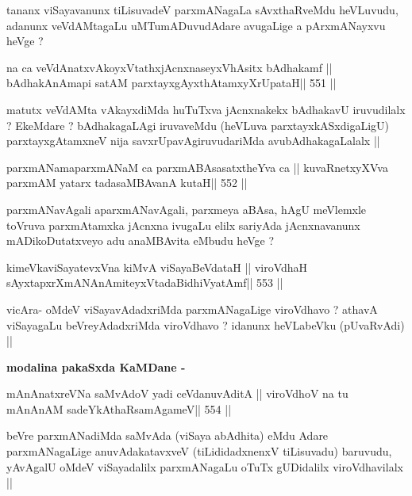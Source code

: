 \begin{artha}
tananx viSayavanunx tiLisuvadeV parxmANagaLa sAvxthaRveMdu heVLuvudu,
adanunx veVdAMtagaLu uMTumADuvudAdare avugaLige a pArxmANayxvu heVge ?
\end{artha}

\begin{shl}
na ca veVdAnatxvAkoyxVtathxjAcnxnaseyxVhAsitx bAdhakamf ||
bAdhakAnAmapi satAM parxtayxgAyxthAtamxyXrUpataH\hfill || 551 ||
\end{shl}

\begin{artha}
matutx veVdAMta vAkayxdiMda huTuTxva jAcnxnakekx bAdhakavU iruvudilalx
? EkeMdare ? bAdhakagaLAgi iruvaveMdu (heVLuva parxtayxkASxdigaLigU)
parxtayxgAtamxneV nija savxrUpavAgiruvudariMda avubAdhakagaLalalx ||
\end{artha}

\begin{shl}
parxmANamaparxmANaM ca parxmABAsasatxtheYva ca ||
kuvaRnetxyXVva parxmAM yatarx tadasaMBAvanA kutaH\hfill || 552 ||
\end{shl}

\begin{artha}
parxmANavAgali aparxmANavAgali, parxmeya aBAsa, hAgU meVlemxle
toVruva parxmAtamxka jAcnxna ivugaLu elilx sariyAda jAcnxnavanunx
mADikoDutatxveyo adu anaMBAvita eMbudu heVge ? 
\end{artha}

\begin{shl}
kimeVkaviSayatevxVna kiMvA viSayaBeVdataH ||
viroVdhaH sAyxtapxrXmANAnAmiteyxVtadaBidhiVyatAmf\hfill || 553 ||
\end{shl}

\begin{artha}
vicAra- oMdeV viSayavAdadxriMda parxmANagaLige viroVdhavo ? athavA
viSayagaLu beVreyAdadxriMda viroVdhavo ? idanunx heVLabeVku
(pUvaRvAdi) ||
\end{artha}

\medskip
\centerline{\textbf{modalina pakaSxda KaMDane -}}

\begin{shl}
mAnAnatxreVNa saMvAdoV yadi ceVdanuvAditA ||
viroVdhoV na tu mAnAnAM sadeYkAthaRsamAgameV\hfill || 554 ||
\end{shl}

\begin{artha}
beVre parxmANadiMda saMvAda (viSaya abAdhita) eMdu Adare
parxmANagaLige anuvAdakatavxveV (tiLididadxnenxV tiLisuvadu) baruvudu,
yAvAgalU oMdeV viSayadalilx parxmANagaLu oTuTx gUDidalilx
viroVdhavilalx ||
\end{artha}

